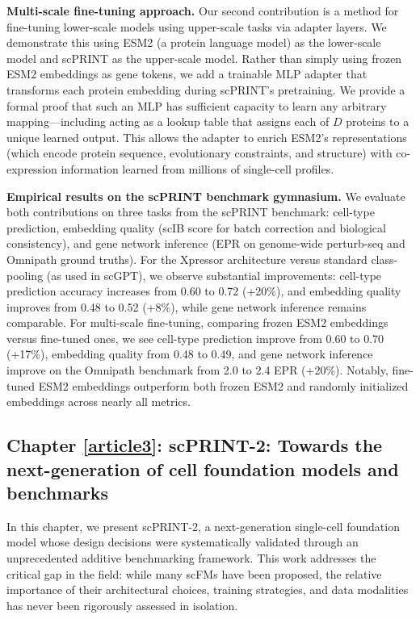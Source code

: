 \textbf{Multi-scale fine-tuning approach.} Our second contribution is a method for fine-tuning lower-scale models using upper-scale tasks via adapter layers. We demonstrate this using \gls{ESM}2 (a protein language model) as the lower-scale model and \gls{scPRINT} as the upper-scale model. Rather than simply using frozen \gls{ESM}2 embeddings as gene tokens, we add a trainable \gls{MLP} adapter that transforms each protein embedding during \gls{scPRINT}'s pretraining. We provide a formal proof that such an \gls{MLP} has sufficient capacity to learn any arbitrary mapping---including acting as a lookup table that assigns each of $D$ proteins to a unique learned output. This allows the adapter to enrich \gls{ESM}2's representations (which encode protein sequence, evolutionary constraints, and structure) with co-expression information learned from millions of single-cell profiles.

\textbf{Empirical results on the scPRINT benchmark gymnasium.} We evaluate both contributions on three tasks from the \gls{scPRINT} benchmark: cell-type prediction, embedding quality (\gls{scIB} score for batch correction and biological consistency), and gene network inference (\gls{EPR} on genome-wide perturb-seq and Omnipath ground truths). For the Xpressor architecture versus standard class-pooling (as used in \gls{scGPT}), we observe substantial improvements: cell-type prediction accuracy increases from 0.60 to 0.72 (+20\%), and embedding quality improves from 0.48 to 0.52 (+8\%), while gene network inference remains comparable. For multi-scale fine-tuning, comparing frozen \gls{ESM}2 embeddings versus fine-tuned ones, we see cell-type prediction improve from 0.60 to 0.70 (+17\%), embedding quality from 0.48 to 0.49, and gene network inference improve on the Omnipath benchmark from 2.0 to 2.4 \gls{EPR} (+20\%). Notably, fine-tuned \gls{ESM}2 embeddings outperform both frozen \gls{ESM}2 and randomly initialized embeddings across nearly all metrics.

\subsection{Chapter \ref{article3}: scPRINT-2: Towards the next-generation of cell foundation models and benchmarks}

In this chapter, we present \gls{scPRINT}-2, a next-generation single-cell foundation model whose design decisions were systematically validated through an unprecedented additive benchmarking framework. This work addresses the critical gap in the field: while many \gls{scFM}s have been proposed, the relative importance of their architectural choices, training strategies, and data modalities has never been rigorously assessed in isolation.

